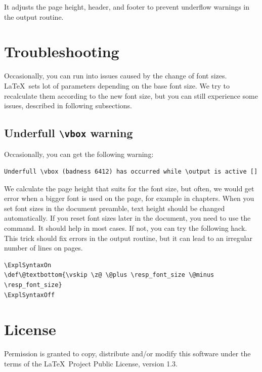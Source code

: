 \documentclass{ltxdoc}
\newcommand\StartDescribe[1]{%
  \par\medskip\noindent\DescribeMacro#1
}
\begin{document}
\StartDescribe\fixtextheight
\cmd\fixtextheight

\noindent It adjusts the page height, header, and footer to prevent underflow
\cmd{\vbox} warnings in the output routine.



\section{Troubleshooting}

Occasionally, you can run into issues caused by the change of font sizes. \LaTeX\ sets lot of parameters 
depending on the base font size. We try to recalculate them according to the new font size, but you can still
experience some issues, described in following subsections.

\subsection{Underfull \texttt{\textbackslash vbox} warning}

Occasionally, you can get the following warning:

\begin{verbatim}
Underfull \vbox (badness 6412) has occurred while \output is active []
\end{verbatim}

We calculate the page height that suits  for the font size, but often,
we would get error when a bigger font is used on the page,
for example in chapters. When you set font sizes in the document preamble,
text height should be changed automatically. If you reset font sizes later in the
document, you need to use the \cmd{\fixtextheight} command. It should help in
most cases. If not, you can try the following hack.
This trick should fix \cmd{\vbox} errors in the output routine, but it can lead 
to an irregular number of lines on pages.


\begin{verbatim}
\ExplSyntaxOn
\def\@textbottom{\vskip \z@ \@plus \resp_font_size \@minus \resp_font_size}
\ExplSyntaxOff
\end{verbatim}

\section{License}

Permission is granted to copy, distribute and/or modify this software
under the terms of the \LaTeX\ Project Public License, version 1.3.
\end{document}
